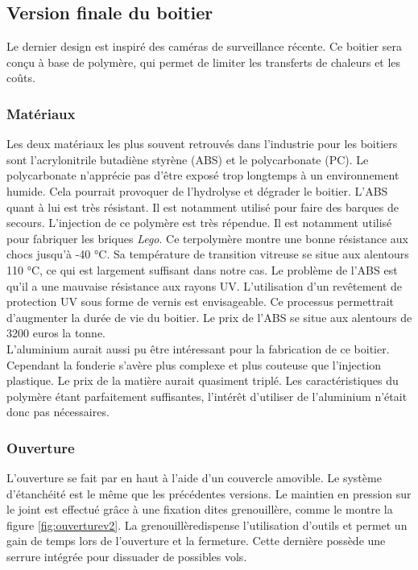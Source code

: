 \subsection{Version finale du boitier}

Le dernier design est inspiré des caméras de surveillance récente. Ce boitier sera conçu à base de 
polymère, qui permet de limiter les transferts de chaleurs et les coûts.

\subsubsection{Matériaux}

Les deux matériaux les plus souvent retrouvés dans l’industrie pour les boitiers sont l’acrylonitrile 
butadiène styrène (ABS) et le polycarbonate (PC). Le polycarbonate n’apprécie pas d’être exposé trop 
longtemps à un environnement humide. Cela pourrait provoquer de l’hydrolyse et dégrader le boitier. 
L’ABS quant à lui est très résistant. Il est notamment utilisé pour faire des barques de secours.  
L’injection de ce polymère est très répendue. Il est notamment utilisé pour fabriquer les briques \emph{Lego}. 
Ce terpolymère montre une bonne résistance aux chocs jusqu'à -40 °C. Sa température de transition vitreuse se 
situe aux alentours 110 °C, ce qui est largement suffisant dans notre cas. Le problème de l’ABS est qu’il a une mauvaise 
résistance aux rayons UV. L’utilisation d’un revêtement de protection UV sous forme de vernis est envisageable. 
Ce processus permettrait d’augmenter la durée de vie du boitier. Le prix de l’ABS se situe aux alentours 
de 3200 euros la tonne\footnotemark[1].\\
L’aluminium aurait aussi pu être intéressant pour la fabrication de ce boitier. Cependant la fonderie 
s’avère plus complexe et plus couteuse que l’injection plastique. Le prix de la matière aurait quasiment 
triplé. Les caractéristiques du polymère étant parfaitement suffisantes, l’intérêt d’utiliser de l’aluminium 
n’était donc pas nécessaires.


\subsubsection{Ouverture}

L’ouverture se fait par en haut à l’aide d’un couvercle amovible. Le système d’étanchéité est le 
même que les précédentes versions. Le maintien en pression sur le joint est effectué grâce à 
une fixation dites grenouillère, comme le montre la figure \ref{fig:ouverturev2}. La grenouillère\footnotemark[1] 
dispense l’utilisation d’outils et permet un gain de temps lors de l’ouverture et la fermeture. 
Cette dernière possède une serrure intégrée pour dissuader de possibles vols.

